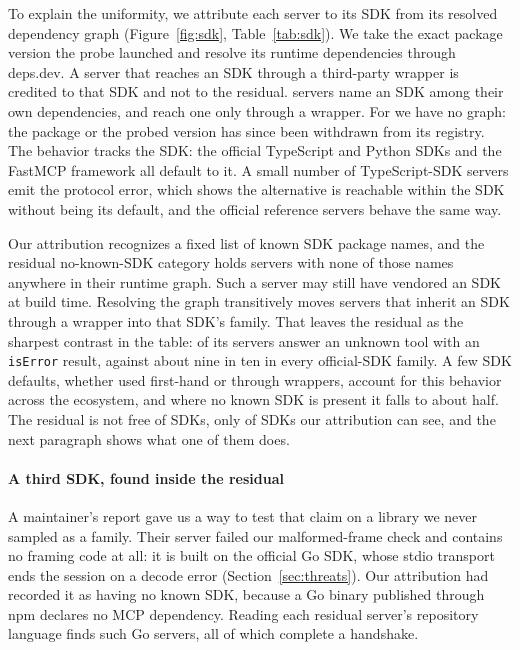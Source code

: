 To explain the uniformity, we attribute each server to its SDK from its resolved
dependency graph (Figure~\ref{fig:sdk}, Table~\ref{tab:sdk}). We take the exact
package version the probe launched and resolve its runtime dependencies through
deps.dev. A server that reaches an SDK through a third-party wrapper is credited
to that SDK and not to the residual. \SDKDirect{} servers name an SDK among their own
dependencies, and \SDKIndirect{} reach one only through a wrapper. For
\SDKUnattributed{} we have no graph: the package or the probed version has since been
withdrawn from its registry. The behavior tracks the SDK: the
official TypeScript and Python SDKs and the FastMCP framework all default to it. A
small number of TypeScript-SDK servers emit the protocol error, which shows the
alternative is reachable within the SDK without being its default, and the official
reference servers behave the same way.

Our attribution recognizes a fixed list of known SDK package names, and the residual
\textsf{no-known-SDK} category holds servers with none of those names anywhere in
their runtime graph. Such a server may still have vendored an SDK at build time.
Resolving the graph transitively moves servers that inherit an SDK through a wrapper
into that SDK's family. That leaves the residual as the sharpest contrast in the
table: \SDKNoSDKRate{} of its \SDKNoSDK{} servers answer an unknown tool with an
\texttt{isError} result, against about nine in ten in every official-SDK family.
A few SDK defaults, whether used first-hand or through wrappers, account for this
behavior across the ecosystem, and where no known SDK is present it falls to about
half. The residual is not free of SDKs, only of SDKs our attribution can see, and
the next paragraph shows what one of them does.

\paragraph{A third SDK, found inside the residual}
A maintainer's report gave us a way to test that claim on a library we never sampled
as a family. Their server failed our malformed-frame check and contains no framing
code at all: it is built on the official Go SDK, whose stdio transport ends the
session on a decode error (Section~\ref{sec:threats}). Our attribution had recorded it
as having no known SDK, because a Go binary published through npm declares no MCP
dependency. Reading each residual server's repository language finds
\NGoResidual{} such Go servers, all of which complete a handshake.

